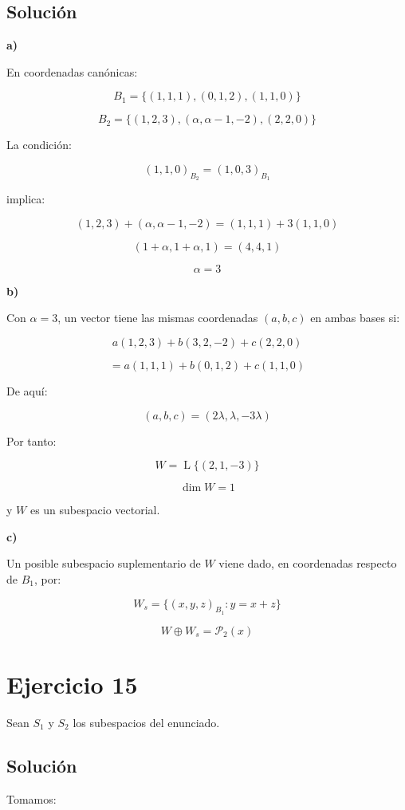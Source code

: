 \documentclass[11pt,a4paper]{article}
\newcommand{\Pn}{\mathcal{P}}
\newcommand{\Span}{\operatorname{L}}
\newcommand{\dimn}{\operatorname{dim}}
\begin{document}
	\subsection{Solución}

	\textbf{a)}

	En coordenadas canónicas:

	\[
	B_1=
	\{(1,1,1),(0,1,2),(1,1,0)\}
	\]

	\[
	B_2=
	\{(1,2,3),(\alpha,\alpha-1,-2),(2,2,0)\}
	\]

	La condición:

	\[
	(1,1,0)_{B_2}
	=
	(1,0,3)_{B_1}
	\]

	implica:

	\[
	(1,2,3)+(\alpha,\alpha-1,-2)
	=
	(1,1,1)+3(1,1,0)
	\]

	\[
	(1+\alpha,1+\alpha,1)
	=
	(4,4,1)
	\]

	\[
	\boxed{\alpha=3}
	\]

	\textbf{b)}

	Con $\alpha=3$, un vector tiene las mismas coordenadas $(a,b,c)$ en ambas bases si:

	\[
	a(1,2,3)+b(3,2,-2)+c(2,2,0)
	\]

	\[
	=
	a(1,1,1)+b(0,1,2)+c(1,1,0)
	\]

	De aquí:

	\[
	(a,b,c)
	=
	(2\lambda,\lambda,-3\lambda)
	\]

	Por tanto:

	\[
	W=
	\Span\{(2,1,-3)\}
	\]

	\[
	\boxed{
	\dimn W=1
	}
	\]

	y $W$ es un subespacio vectorial.

	\textbf{c)}

	Un posible subespacio suplementario de $W$ viene dado, en coordenadas respecto de $B_1$, por:

	\[
	W_s=
	\{(x,y,z)_{B_1}:y=x+z\}
	\]

	\[
	\boxed{
	W\oplus W_s=\Pn_2(x)
	}
	\]

\section{Ejercicio 15}
	Sean $S_1$ y $S_2$ los subespacios del enunciado.

	\subsection{Solución}

	Tomamos:
\end{document}
